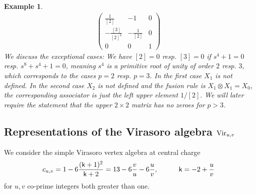 \documentclass[a4paper, reqno]{amsart}
\newtheorem{example}[theorem]{Example}
\theoremstyle{introTheorems}
\newcommand\Vir{\textup{Vir}}
\renewcommand{\1}{\mathbbold{1}}
\begin{document}
\begin{example}
\begin{align*}
\begin{pmatrix}
\frac{1}{[2]}
&
-1
& 
0
\\
-\frac{[3]}{[2]^2}
&
-\frac{1}{[2]}
& 
0
\\
0
&
0
&
1
\end{pmatrix}
\end{align*}
We discuss the exceptional cases: We have $[2]=0$ resp. $[3]=0$ if $s^4+1=0$ resp. $s^8+s^4+1=0$, meaning $s^4$ is a primitive root of unity of order $2$ resp. $3$, which  corresponds to the cases $p=2$ resp. $p=3$. In the first case $X_1$ is not defined. In the second case $X_2$ is not defined and the fusion rule is $X_1\otimes X_1=X_0$, the corresponding associator is just the left upper element $1/[2]$. We will later require the statement that the upper $2\times 2$ matrix has no zeroes for $p>3$. 

\end{example}

\subsection{Representations of the Virasoro algebra \texorpdfstring{$\Vir_{u,v}$}{}}\label{subsec:CartanVir}

We consider the simple Virasoro vertex algebra at central charge 
\[
c_{u,v}=1-6\frac{(\mathsf{k}+1)^2}{\mathsf{k}+2}
=13-6\frac{v}{u}-6\frac{u}{v},\qquad\quad 
\mathsf{k}=-2+\frac{u}{v}
\]
for $u, v$ co-prime integers both greater than one.

\end{document}
